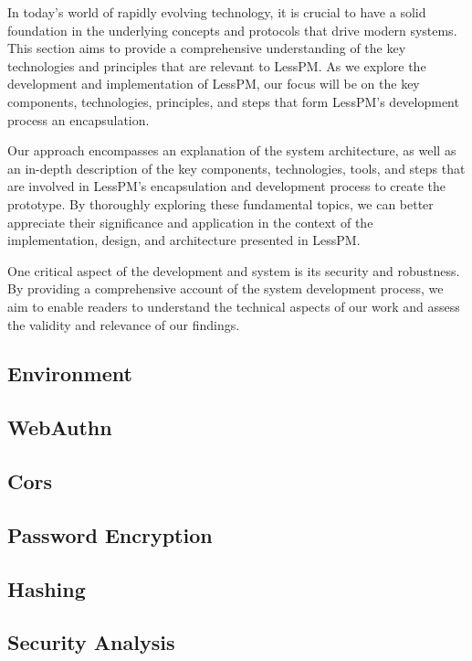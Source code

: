 
In today's world of rapidly evolving technology, it is crucial to have a
solid foundation in the underlying concepts and protocols that drive modern
systems.
This section aims to provide a comprehensive understanding of the key
technologies and principles that are relevant to LessPM\@.
As we explore the development and implementation of LessPM, our focus will be
on the key components, technologies, principles, and steps that form LessPM's
development process an encapsulation.

Our approach encompasses an explanation of the system architecture, as well as
an in-depth description of the key components, technologies, tools, and steps
that are involved in LessPM's encapsulation and development process to create
the prototype.
By thoroughly exploring these fundamental topics, we can better appreciate their
significance and application in the context of the implementation, design, and
architecture presented in LessPM\@.

One critical aspect of the development and system is its security and
robustness.
By providing a comprehensive account of the system development process, we aim
to enable readers to understand the technical aspects of our work and assess the
validity and relevance of our findings.

\subsection{Environment}\label{subsec:environment}


\subsection{WebAuthn}\label{subsec:webauthn-methodology}


\subsection{Cors}\label{subsec:cors}


\subsection{Password Encryption}\label{subsec:password-encryption}


\subsection{Hashing}\label{subsec:hashing}



\subsection{Security Analysis}\label{subsec:security-analysis}


